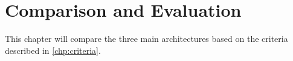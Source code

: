 \chapter{Comparison and Evaluation}
\label{chp:compeval}

This chapter will compare the three main architectures based on the criteria described in \ref{chp:criteria}.

